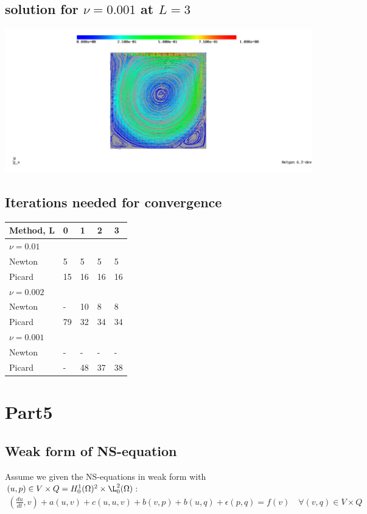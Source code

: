 \documentclass[11pt]{article}
\begin{document}
\subsection{solution for $\nu=0.001$ at $L=3$}
\includegraphics[width=\columnwidth]{ex34_0001_stream}


\subsection{Iterations needed for convergence}

\begin{tabular}{l| l l l l}
	Method, L & 0 &1 &2 &3 \\
	\hline
	$\nu=0.01$\\
	Newton	  & 5 & 5&5 &5\\
	Picard	  & 15 & 16&16 &16\\
	\hline
	$\nu=0.002$\\
	Newton	  & - & 10&8 &8\\
	Picard	  & 79 & 32&34 &34\\
	\hline
	$\nu=0.001$\\
	Newton	  & - & - &- &-\\
	Picard	  & - & 48&37 &38\\
\end{tabular}

\section{Part5}
\subsection{Weak form of NS-equation}
Assume we given the NS-equations in weak form with $(u, p)\in V \times Q=H_0^1(\Omega)^2\times\L_0^2(\Omega)$:
\begin{align}
	(\frac{du}{dt}, v) + a(u, v) + c(u,u,v) + b(v,p) + b(u,q) + \epsilon(p,q) = f(v) \quad \forall (v,q)\in V \times Q
\end{align}
\end{document}
